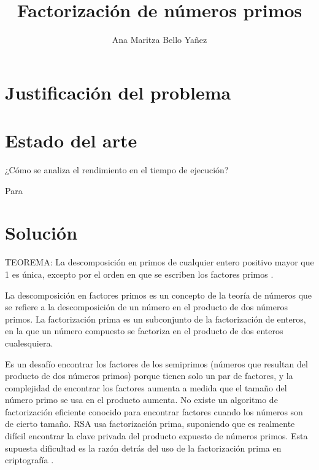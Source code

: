 \documentclass{article}
\begin{document}
\title{Factorización de números primos}
\author{Ana Maritza Bello Yañez}
\maketitle



\section{Justificación del problema}

\section{Estado del arte}

¿Cómo se analiza el rendimiento en el tiempo de ejecución?

Para 


\section{Solución}



TEOREMA:
La descomposición en primos de cualquier entero positivo mayor que 1 es única,
excepto por el orden en que se escriben los factores primos \cite{lewinter2015elementary}.

La descomposición en factores primos es un concepto de la teoría de números que
se refiere a la descomposición de un número en el producto de dos números
primos. La factorización prima es un subconjunto de la factorización de enteros,
en la que un número compuesto se factoriza en el producto de dos enteros
cualesquiera.

Es un desafío encontrar los factores de los semiprimos (números que resultan del
producto de dos números primos) porque tienen solo un par de factores, y la
complejidad de encontrar los factores aumenta a medida que el tamaño del número
primo se usa en el producto aumenta. No existe un algoritmo de factorización
eficiente conocido para encontrar factores cuando los números son de cierto
tamaño. RSA usa factorización prima, suponiendo que es realmente difícil
encontrar la clave privada del producto expuesto de números primos. Esta
supuesta dificultad es la razón detrás del uso de la factorización prima en
criptografía \cite{raj2019foundations}.
\end{document}
